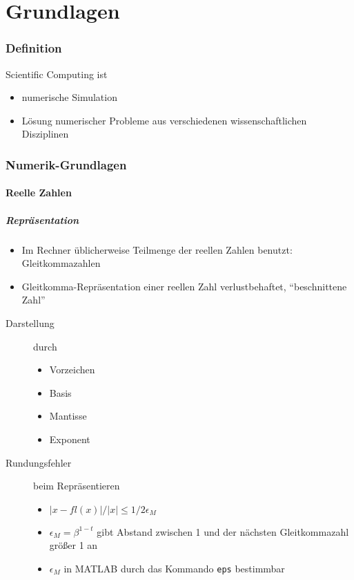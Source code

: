 \documentclass[a4paper, 12pt]{article}
\begin{document}
\tableofcontents
\pagebreak



\part{Grundlagen}



\section{Definition}
Scientific Computing ist
\begin{itemize}
  \item numerische Simulation
  \item Lösung numerischer Probleme aus verschiedenen wissenschaftlichen Disziplinen
\end{itemize}



\section{Numerik-Grundlagen}


\subsection{Reelle Zahlen}

\subsubsection*{Repräsentation}
\begin{itemize}
  \item Im Rechner üblicherweise Teilmenge der reellen Zahlen benutzt: Gleitkommazahlen
  \item Gleitkomma-Repräsentation einer reellen Zahl verlustbehaftet, ``beschnittene Zahl''
\end{itemize}
\begin{description}
  \item[Darstellung] durch
    \begin{itemize}
      \item Vorzeichen
      \item Basis
      \item Mantisse
      \item Exponent
    \end{itemize}
  \item[Rundungsfehler] beim Repräsentieren
    \begin{itemize}
      \item \(|x-fl(x)|/|x| \le 1/2 \epsilon_M\)
      \item \(\epsilon_M = \beta^{1-t}\) gibt Abstand zwischen 1 und der nächsten Gleitkommazahl größer 1 an
      \item \(\epsilon_M\) in MATLAB durch das Kommando \texttt{eps} bestimmbar
    \end{itemize}
\end{description}
\end{document}
